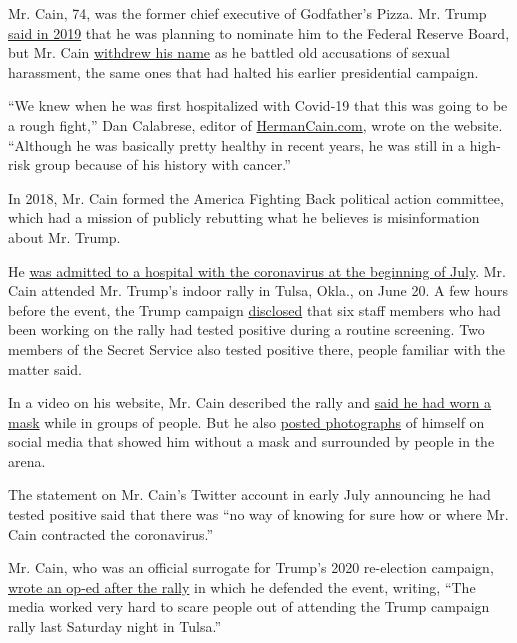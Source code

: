 Mr. Cain, 74, was the former chief executive of Godfather's Pizza. Mr.
Trump
\href{https://www.nytimes3xbfgragh.onion/2019/04/04/business/herman-cain-federal-reserve.html}{said
in 2019} that he was planning to nominate him to the Federal Reserve
Board, but Mr. Cain
\href{https://www.nytimes3xbfgragh.onion/2019/04/22/us/politics/trump-herman-cain-federal-reserve.html}{withdrew
his name} as he battled old accusations of sexual harassment, the same
ones that had halted his earlier presidential campaign.

``We knew when he was first hospitalized with Covid-19 that this was
going to be a rough fight,'' Dan Calabrese, editor of
\href{http://hermancain.com/}{HermanCain.com}, wrote on the website.
``Although he was basically pretty healthy in recent years, he was still
in a high-risk group because of his history with cancer.''

In 2018, Mr. Cain formed the America Fighting Back political action
committee, which had a mission of publicly rebutting what he believes is
misinformation about Mr. Trump.

He
\href{https://www.nytimes3xbfgragh.onion/2020/07/02/us/politics/herman-cain-coronavirus.html}{was
admitted to a hospital with the coronavirus at the beginning of July}.
Mr. Cain attended Mr. Trump's indoor rally in Tulsa, Okla., on June 20.
A few hours before the event, the Trump campaign
\href{https://www.nytimes3xbfgragh.onion/2020/06/20/us/politics/tulsa-trump-rally.html?searchResultPosition=64}{disclosed}
that six staff members who had been working on the rally had tested
positive during a routine screening. Two members of the Secret Service
also tested positive there, people familiar with the matter said.

In a video on his website, Mr. Cain described the rally and
\href{https://hermancain.com/trump-tulsa-rally-i-was-there/?utm_source=twitter\&utm_medium=thenewvoice\&utm_content=2020-06-22}{said
he had worn a mask} while in groups of people. But he also
\href{https://twitter.com/THEHermanCain/status/1274489632886075398?s=20}{posted
photographs} of himself on social media that showed him without a mask
and surrounded by people in the arena.

The statement on Mr. Cain's Twitter account in early July announcing he
had tested positive said that there was ``no way of knowing for sure how
or where Mr. Cain contracted the coronavirus.''

Mr. Cain, who was an official surrogate for Trump's 2020 re-election
campaign,
\href{https://www.westernjournal.com/herman-cain-tulsa-trump-rally-crowd-huge-enthusiastic/?utm_source=Twitter\&utm_medium=PostTopSharingButtons\&utm_campaign=websitesharingbuttons}{wrote
an op-ed after the rally} in which he defended the event, writing, ``The
media worked very hard to scare people out of attending the Trump
campaign rally last Saturday night in Tulsa.''


